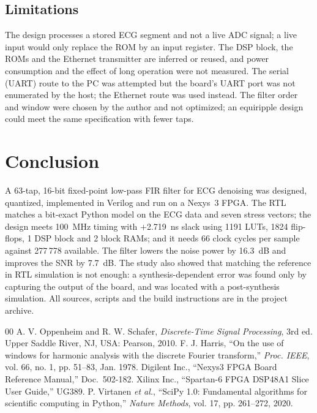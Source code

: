 \documentclass{ieeeaccess}
\newcommand{\resLUT}{1191}
\newcommand{\resFF}{1824}
\newcommand{\resDSP}{1}
\newcommand{\resBRAM}{2}
\newcommand{\resWNS}{+2.719}
\begin{document}
\subsection{Limitations}
The design processes a stored ECG segment and not a live ADC signal; a live input would only replace the ROM by an input register. The DSP block, the ROMs and the Ethernet transmitter are inferred or reused, and power consumption and the effect of long operation were not measured. The serial (UART) route to the PC was attempted but the board's UART port was not enumerated by the host; the Ethernet route was used instead. The filter order and window were chosen by the author and not optimized; an equiripple design could meet the same specification with fewer taps.

\section{Conclusion}
A 63-tap, 16-bit fixed-point low-pass FIR filter for ECG denoising was designed, quantized, implemented in Verilog and run on a Nexys~3 FPGA. The RTL matches a bit-exact Python model on the ECG data and seven stress vectors; the design meets 100~MHz timing with \resWNS{}~ns slack using \resLUT{} LUTs, \resFF{} flip-flops, \resDSP{} DSP block and \resBRAM{} block RAMs; and it needs 66 clock cycles per sample against 277\,778 available. The filter lowers the noise power by 16.3~dB and improves the SNR by 7.7~dB. The study also showed that matching the reference in RTL simulation is not enough: a synthesis-dependent error was found only by capturing the output of the board, and was located with a post-synthesis simulation. All sources, scripts and the build instructions are in the project archive.

\begin{thebibliography}{00}
 A. V. Oppenheim and R. W. Schafer, \emph{Discrete-Time Signal Processing}, 3rd ed. Upper Saddle River, NJ, USA: Pearson, 2010.
 F. J. Harris, ``On the use of windows for harmonic analysis with the discrete Fourier transform,'' \emph{Proc. IEEE}, vol. 66, no. 1, pp. 51--83, Jan. 1978.
 Digilent Inc., ``Nexys3 FPGA Board Reference Manual,'' Doc.\ 502-182.
 Xilinx Inc., ``Spartan-6 FPGA DSP48A1 Slice User Guide,'' UG389.
 P. Virtanen \emph{et al.}, ``SciPy 1.0: Fundamental algorithms for scientific computing in Python,'' \emph{Nature Methods}, vol. 17, pp. 261--272, 2020.
\end{thebibliography}

\EOD
\end{document}
